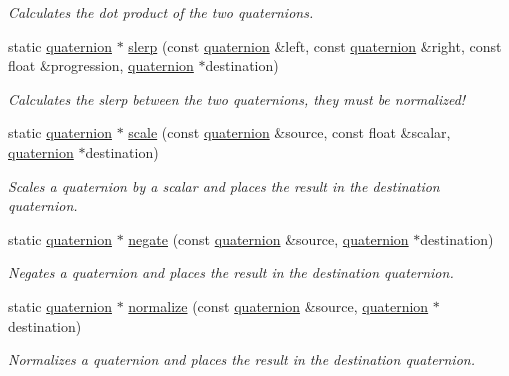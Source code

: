 \begin{DoxyCompactItemize}
\begin{DoxyCompactList}\small\item\em Calculates the dot product of the two quaternions. \end{DoxyCompactList}\item 
static \hyperlink{classflounder_1_1quaternion}{quaternion} $\ast$ \hyperlink{classflounder_1_1quaternion_a2280b2fd696e25f4384da5f080e5b8d3}{slerp} (const \hyperlink{classflounder_1_1quaternion}{quaternion} \&left, const \hyperlink{classflounder_1_1quaternion}{quaternion} \&right, const float \&progression, \hyperlink{classflounder_1_1quaternion}{quaternion} $\ast$destination)
\begin{DoxyCompactList}\small\item\em Calculates the slerp between the two quaternions, they must be normalized! \end{DoxyCompactList}\item 
static \hyperlink{classflounder_1_1quaternion}{quaternion} $\ast$ \hyperlink{classflounder_1_1quaternion_ab64214b9e1a22b4d997d913d7e6b9336}{scale} (const \hyperlink{classflounder_1_1quaternion}{quaternion} \&source, const float \&scalar, \hyperlink{classflounder_1_1quaternion}{quaternion} $\ast$destination)
\begin{DoxyCompactList}\small\item\em Scales a quaternion by a scalar and places the result in the destination quaternion. \end{DoxyCompactList}\item 
static \hyperlink{classflounder_1_1quaternion}{quaternion} $\ast$ \hyperlink{classflounder_1_1quaternion_ad3898cb42d77e3d6ae65f829df895171}{negate} (const \hyperlink{classflounder_1_1quaternion}{quaternion} \&source, \hyperlink{classflounder_1_1quaternion}{quaternion} $\ast$destination)
\begin{DoxyCompactList}\small\item\em Negates a quaternion and places the result in the destination quaternion. \end{DoxyCompactList}\item 
static \hyperlink{classflounder_1_1quaternion}{quaternion} $\ast$ \hyperlink{classflounder_1_1quaternion_ae5092edec94adfdd43add8f3825072fe}{normalize} (const \hyperlink{classflounder_1_1quaternion}{quaternion} \&source, \hyperlink{classflounder_1_1quaternion}{quaternion} $\ast$destination)
\begin{DoxyCompactList}\small\item\em Normalizes a quaternion and places the result in the destination quaternion. \end{DoxyCompactList}\item 

\end{DoxyCompactItemize}
